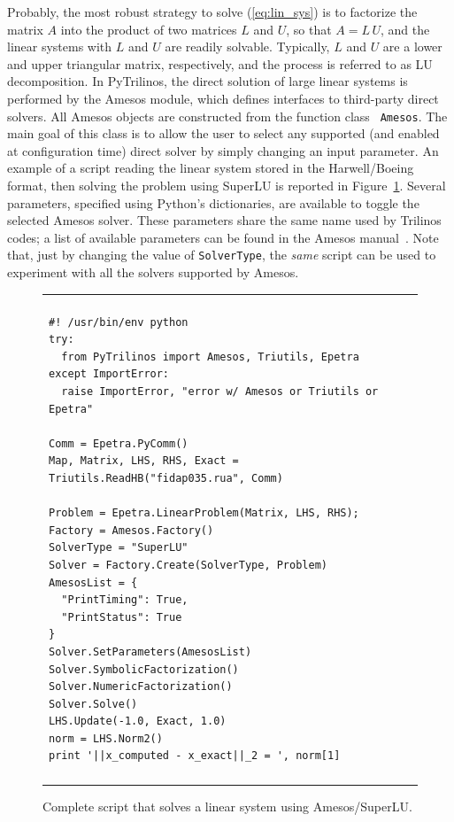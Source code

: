 \documentclass[10pt,relax]{SANDreport}
\begin{document}
Probably, the most robust strategy to solve (\ref{eq:lin_sys}) is to
factorize the matrix $A$ into the product of two matrices $L$ and
$U$, so that $A = L \, U$, and the linear systems with $L$ and $U$
are readily solvable. Typically, $L$ and $U$ are a lower and upper
triangular matrix, respectively, and the process is referred to as
LU decomposition. In PyTrilinos, the direct solution of large linear
systems is performed by the Amesos module, which defines interfaces
to third-party direct solvers. All Amesos objects are constructed
from the function class {\tt
  Amesos}.   The main goal of this class is to allow the user to select
any supported (and enabled at configuration time) direct solver by
simply changing an input parameter. An example of a script reading
the linear system stored in the Harwell/Boeing format, then solving
the problem using SuperLU is reported in Figure~\ref{fig:amesos}.
Several parameters, specified using Python's dictionaries, are
available to toggle the selected Amesos solver. These parameters
share the same name used by Trilinos codes; a list of available
parameters can be found in the Amesos
manual~\cite{Amesos-Reference-Guide}. Note that, just by changing
the value of \verb!SolverType!, the {\sl same} script can be used to
experiment with all the solvers supported by Amesos.

\begin{figure}
\begin{center}
\begin{tabular}{| p{12cm} |}
\hline
\\
\footnotesize
\begin{minipage}{11.5cm}
\begin{verbatim}
#! /usr/bin/env python
try:
  from PyTrilinos import Amesos, Triutils, Epetra
except ImportError:
  raise ImportError, "error w/ Amesos or Triutils or Epetra"

Comm = Epetra.PyComm()
Map, Matrix, LHS, RHS, Exact = Triutils.ReadHB("fidap035.rua", Comm)

Problem = Epetra.LinearProblem(Matrix, LHS, RHS);
Factory = Amesos.Factory()
SolverType = "SuperLU"
Solver = Factory.Create(SolverType, Problem)
AmesosList = {
  "PrintTiming": True,
  "PrintStatus": True
}
Solver.SetParameters(AmesosList)
Solver.SymbolicFactorization()
Solver.NumericFactorization()
Solver.Solve()
LHS.Update(-1.0, Exact, 1.0)
norm = LHS.Norm2()
print '||x_computed - x_exact||_2 = ', norm[1]
\end{verbatim}
\end{minipage}
\\
\\
\hline
\end{tabular}
\caption{Complete script that solves a linear system using Amesos/SuperLU.}
\label{fig:amesos}
\end{center}
\end{figure}
\end{document}
